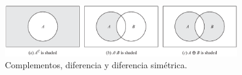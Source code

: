 \documentclass[xcolor={svgnames},
  hyperref={colorlinks}, 
  spanish, 12pt]{beamer}
\numberwithin{equation}{section} %
\numberwithin{figure}{section} %
\begin{document}
\begin{frame}
 \begin{figure}
 \centering
 \includegraphics[width=10cm,keepaspectratio=true]{./venn_complemento.png}
 \caption{Complementos, diferencia y diferencia simétrica.}
 \label{fig:0104}
\end{figure}

\end{frame}

\end{document}
